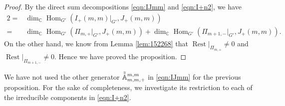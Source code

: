 \begin{proof}
By the direct sum decompositions \eqref{eqn:IJmm} and \eqref{eqn:I+n2}, 
 we have
\begin{align*}
  2 =& \dim_{\mathbb{C}} \operatorname{Hom}_{G'}(I_+(m, m)|_{G'}, J_+(m, m))
\\
    =&\dim_{\mathbb{C}} \operatorname{Hom}_{G'}(\Pi_{m, +}|_{G'}, J_+(m, m))
 + \dim_{\mathbb{C}} \operatorname{Hom}_{G'}(\Pi_{m+1, -}|_{G'}, J_+(m, m)).   
\end{align*}
On the other hand,
 we know from Lemma \ref{lem:152268}
 that ${\operatorname{Rest}}|_{\Pi_{m,+}}\ne 0$
 and ${\operatorname{Rest}}|_{\Pi_{m+1,-}}\ne 0$.  
Hence we have proved the proposition.  
\end{proof}
We have not used the other generator
 $\tilde{\tilde{{\mathbb{A}}}}_{{m},{m},{+}}^{{m,m}}$ in \eqref{eqn:IJmm}
 for the previous proposition.  
For the sake of completeness,
 we investigate its restriction
 to each of the irreducible components in \eqref{eqn:I+n2}.  


